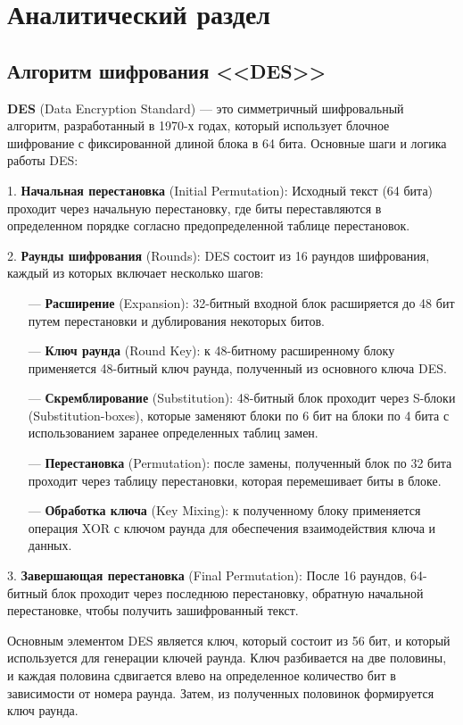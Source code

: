 \chapter{Аналитический раздел}

\section{Алгоритм шифрования <<DES>>}

\textbf{DES} (Data Encryption Standard) --- это симметричный шифровальный алгоритм, разработанный в 1970-х годах, который использует блочное шифрование с фиксированной длиной блока в 64 бита. Основные шаги и логика работы DES:

1. \textbf{Начальная перестановка} (Initial Permutation):
Исходный текст (64 бита) проходит через начальную перестановку, где биты переставляются в определенном порядке согласно предопределенной таблице перестановок.

2. \textbf{Раунды шифрования} (Rounds):
DES состоит из 16 раундов шифрования, каждый из которых включает несколько шагов:
\begin{itemize}
	\item[---] \textbf{Расширение} (Expansion): 32-битный входной блок расширяется до 48 бит путем перестановки и дублирования некоторых битов.
	\item[---] \textbf{Ключ раунда} (Round Key): к 48-битному расширенному блоку применяется 48-битный ключ раунда, полученный из основного ключа DES.
	\item[---] \textbf{Скремблирование} (Substitution): 48-битный блок проходит через S-блоки (Substitution-boxes), которые заменяют блоки по 6 бит на блоки по 4 бита с использованием заранее определенных таблиц замен.
	\item[---] \textbf{Перестановка} (Permutation):  после замены, полученный блок по 32 бита проходит через таблицу перестановки, которая перемешивает биты в блоке.
	\item[---] \textbf{Обработка ключа} (Key Mixing): к полученному блоку применяется операция XOR с ключом раунда для обеспечения взаимодействия ключа и данных.
\end{itemize}

3. \textbf{Завершающая перестановка} (Final Permutation):
После 16 раундов, 64-битный блок проходит через последнюю перестановку, обратную начальной перестановке, чтобы получить зашифрованный текст.

Основным элементом DES является ключ, который состоит из 56 бит, и который используется для генерации ключей раунда. Ключ разбивается на две половины, и каждая половина сдвигается влево на определенное количество бит в зависимости от номера раунда. Затем, из полученных половинок формируется ключ раунда.

